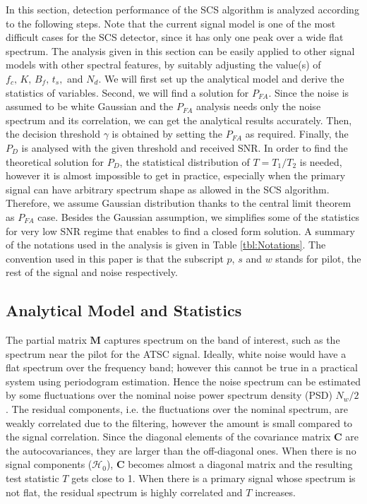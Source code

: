 \documentclass[draftclsnofoot,onecolumn,12pt]{IEEEtran}
\begin{document}
In this section, detection performance of the SCS algorithm is analyzed according to the following steps.
Note that the current signal model is one of the most difficult cases for the SCS detector, since it has only one peak over a wide flat spectrum. The analysis given in this section can be easily applied to other signal models with other spectral features, by suitably adjusting the value(s) of $f_c,\, K, \,B_f, \,t_s,$ and $N_d$.
We will first set up the analytical model and derive the statistics of variables.
Second, we will find a solution for $P_{FA}$. Since the noise is assumed to be white Gaussian and the $P_{FA}$ analysis needs only the noise spectrum and its correlation, we can get the analytical results accurately.
Then, the decision threshold $\gamma$ is obtained by setting the $P_{FA}$ as required.
Finally, the $P_D$ is analysed with the given threshold and received SNR.
In order to find the theoretical solution for $P_D$, the statistical distribution of $T = T_1/T_2$ is needed, however it is almost impossible to get in practice, especially when the primary signal can have arbitrary spectrum shape as allowed in the SCS algorithm. Therefore, we assume Gaussian distribution thanks to the central limit theorem as $P_{FA}$ case.
Besides the Gaussian assumption, we simplifies some of the statistics for very low SNR regime that enables to find a closed form solution.
A summary of the notations used in the analysis is given in Table \ref{tbl:Notations}.
The convention used in this paper is that the subscript $p$, $s$ and $w$ stands for pilot, the rest of the signal and noise respectively.



\subsection{Analytical Model and Statistics}
\label{subsec:stats}

The partial matrix $\mathbf{M}$ captures spectrum on the band of interest, such as the spectrum near the pilot for the ATSC signal.
Ideally, white noise would have a flat spectrum over the frequency band; however this cannot be true in a practical system using periodogram estimation.
Hence the noise spectrum can be estimated by some fluctuations over the nominal noise power spectrum density (PSD) $N_w/2$. The residual components, i.e. the fluctuations over the nominal spectrum, are weakly correlated due to the filtering, however the amount is small compared to the signal correlation.
Since the diagonal elements of the covariance matrix $\mathbf{C}$ are the autocovariances, they are larger than the off-diagonal ones.
When there is no signal components ($\mathcal{H}_0$), $\mathbf{C}$ becomes almost a diagonal matrix and the resulting test statistic $T$ gets close to 1.
When there is a primary signal whose spectrum is not flat, the residual spectrum is highly correlated and $T$ increases.
\end{document}
